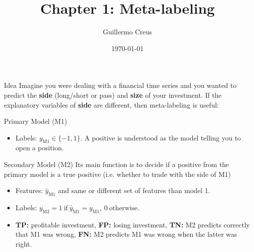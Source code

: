 \documentclass{beamer} %
\title[Meta-labeling]{Chapter 1: Meta-labeling}
\institute[HKUST - UPC]{HKUST - UPC}
\author{Guillermo Creus}
\date{\today}
\begin{document}
\begin{frame}
	\titlepage
\end{frame}



\begin{frame}{Idea}
Imagine you were dealing with a financial time series 
and you wanted to predict the \textbf{side} (long/short or 
pass) and \textbf{size} of your investment. If the explanatory variables of \textbf{side} are different, then meta-labeling is useful:
	
	\begin{block}{\centering Primary Model (M1)}
	\begin{itemize}
		\item Labels: $y_{\text{M1}} \in \{-1, 1\}$. A positive is 
		understood as the model telling you to open a position.
	\end{itemize}
	\end{block}
	
	\begin{block}{\centering Secondary Model (M2)}
	Its main function is to decide if a positive from the primary 
	model is a true positive (i.e. whether to trade with the side 
	of M1)
	\begin{itemize}
		\item Features: $\hat{y}_{\text{M1}}$ and same or different 
		set of features than model 1.
		\item Labels: $y_{\text{M2}} = 1 \ \text{if} \ 
		\hat{y}_{\text{M1}} = y_{\text{M1}},\ 0 \ 
		\text{otherwise}$.
		\item \textbf{TP:} profitable investment, \textbf{FP:} losing 
		investment, 	\textbf{TN:} M2 predicts correctly that M1 was 
		wrong, \textbf{FN:} M2 predicts M1 was wrong when the latter 
		was right.
	\end{itemize}
	\end{block}
\end{frame}
\end{document}
